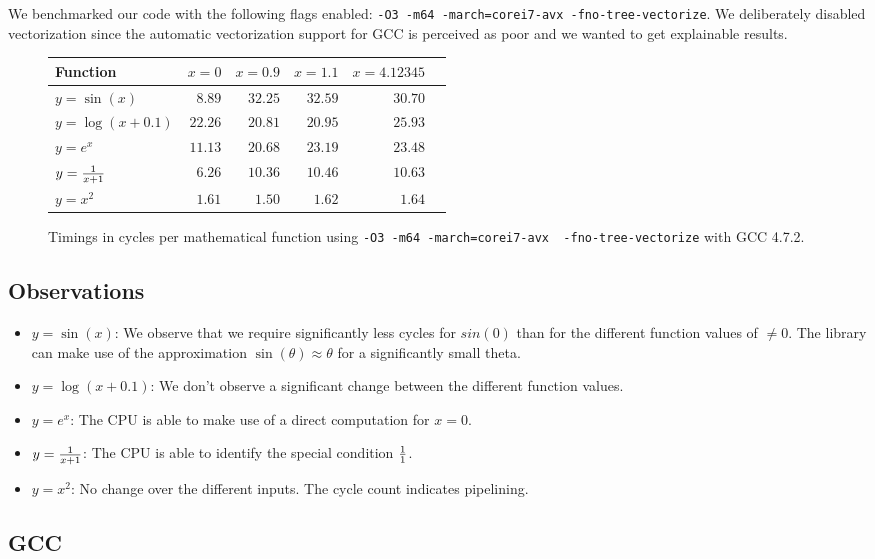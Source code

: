 \documentclass[portrait,a4paper]{article}
\begin{document}
We benchmarked our code with the following flags enabled: \lstinline{-O3 -m64 -march=corei7-avx -fno-tree-vectorize}. We deliberately disabled vectorization since the automatic vectorization support for GCC is perceived as poor and we wanted to get explainable results.
\begin{figure}[H]
    \centering
    \begin{tabular}{l||r|r|r|r|r}
        \textbf{Function} & $x=0$ & $x=0.9$ & $x=1.1$ & $x=4.12345$ \\ \hline
        $y=\sin(x)$     & $8.89$ & $32.25$& $32.59$& $30.70$ \\
        $y=\log(x+0.1)$ & $22.26$ & $20.81$ & $20.95$ & $25.93$\\
        $y=e^x$         & $11.13$ & $20.68$ & $23.19$ & $23.48$\\
        $y={1\over x+1}$& $6.26$ & $10.36$ & $10.46$ & $10.63$\\
        $y=x^2$         & $1.61$  & $1.50$  & $1.62$  & $1.64$
    \end{tabular}
    \caption{Timings in cycles per mathematical function using \lstinline{-O3 -m64 -march=corei7-avx  -fno-tree-vectorize} with GCC 4.7.2.}
\end{figure}

\subsection{Observations}
\begin{itemize}
    \item $y=\sin(x)$: We observe that we require significantly less cycles for $sin(0)$ than for the different function values of $\neq 0$. The library can make use of the approximation $\sin(\theta)\approx \theta$ for a significantly small theta. 
    \item $y=\log(x+0.1)$: We don't observe a significant change between the different function values. 
    \item $y=e^x$: The CPU is able to make use of a direct computation for $x=0$. 
    \item $y={1\over x+1}$: The CPU is able to identify the special condition ${1\over 1}$.
    \item $y=x^2$: No change over the different inputs. The cycle count indicates pipelining.
\end{itemize}









\subsection{GCC}
\end{document}
